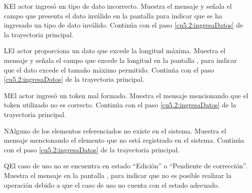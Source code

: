  \begin{UCtrayectoriaA}{K}{El actor ingresó un tipo de dato incorrecto.}
    \UCpaso[\UCsist] Muestra el mensaje  y señala el campo que presenta el dato inválido en la 
    pantalla  para indicar que se ha ingresado un tipo de dato inválido.
    \UCpaso[] Continúa con el paso \ref{cu5.2:ingresaDatos} de la trayectoria principal.
 \end{UCtrayectoriaA}
 \begin{UCtrayectoriaA}{L}{El actor proporciona un dato que excede la longitud máxima.}
    \UCpaso[\UCsist] Muestra el mensaje  y señala el campo que excede la 
    longitud en la pantalla , para indicar que el dato excede el tamaño máximo permitido.
    \UCpaso[] Continúa con el paso \ref{cu5.2:ingresaDatos} de la trayectoria principal.
 \end{UCtrayectoriaA}
 \begin{UCtrayectoriaA}{M}{El actor ingresó un token mal formado.}
    \UCpaso[\UCsist] Muestra el mensaje  mencionando que el token utilizado no es correcto.
    \UCpaso[] Continúa con el paso \ref{cu5.2:ingresaDatos} de la trayectoria principal.
 \end{UCtrayectoriaA}
 \begin{UCtrayectoriaA}{N}{Alguno de los elementos referenciados no existe en el sistema.}
    \UCpaso[\UCsist] Muestra el mensaje  mencionando el elemento que no está registrado en el sistema.
    \UCpaso[] Continúa con el paso \ref{cu5.2:ingresaDatos} de la trayectoria principal.
 \end{UCtrayectoriaA}

  \begin{UCtrayectoriaA}{Q}{El caso de uso no se encuentra en estado ``Edición'' o ``Pendiente de corrección''.}
     \UCpaso[\UCsist] Muestra el mensaje  en la pantalla , para indicar que no es posible realizar la operación debido a que el caso de uso no cuenta con el estado adecuado.
  \end{UCtrayectoriaA}
 

